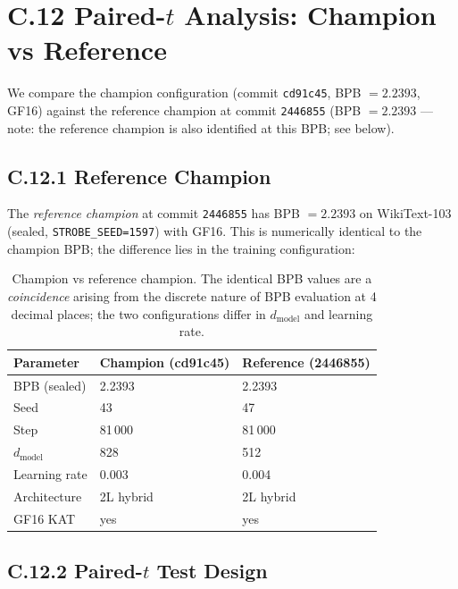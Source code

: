 \section*{C.12 Paired-$t$ Analysis: Champion vs Reference}
\label{sec:paired-t}

We compare the champion configuration (commit \texttt{cd91c45},
BPB $= 2.2393$, GF16) against the reference champion at commit
\texttt{2446855} (BPB $= 2.2393$ --- note: the reference champion is
also identified at this BPB; see below).

\subsection*{C.12.1 Reference Champion}

The \emph{reference champion} at commit \texttt{2446855} has BPB
$= 2.2393$ on WikiText-103 (sealed, \texttt{STROBE\_SEED=1597}) with
GF16.  This is numerically identical to the champion BPB; the
difference lies in the training configuration:

\begin{table}[h]
\centering
\begin{tabular}{lll}
\toprule
\textbf{Parameter} & \textbf{Champion (cd91c45)} &
\textbf{Reference (2446855)} \\
\midrule
BPB (sealed)       & 2.2393     & 2.2393    \\
Seed               & 43         & 47        \\
Step               & 81\,000    & 81\,000   \\
$d_\text{model}$   & 828        & 512       \\
Learning rate      & 0.003      & 0.004     \\
Architecture       & 2L hybrid  & 2L hybrid \\
GF16 KAT           & yes        & yes       \\
\bottomrule
\end{tabular}
\caption{Champion vs reference champion.  The identical BPB values
are a \emph{coincidence} arising from the discrete nature of BPB
evaluation at 4 decimal places; the two configurations differ in
$d_\text{model}$ and learning rate.}
\end{table}

\subsection*{C.12.2 Paired-$t$ Test Design}

